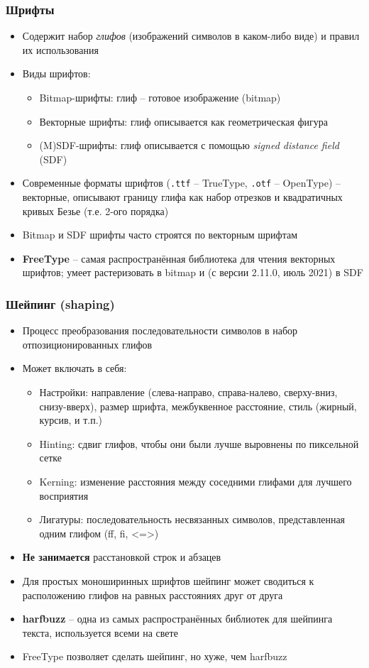 \documentclass{beamer}
\begin{document}
\begin{frame}[fragile]
\frametitle{Шрифты}
\begin{itemize}
\item Содержит набор \textit{глифов} (изображений символов в каком-либо виде) и правил их использования
\pause
\item Виды шрифтов:
\pause
\begin{itemize}
\item Bitmap-шрифты: глиф -- готовое изображение (bitmap)
\pause
\item Векторные шрифты: глиф описывается как геометрическая фигура
\pause
\item (M)SDF-шрифты: глиф описывается с помощью \textit{signed distance field} (SDF)
\end{itemize}
\pause
\item Современные форматы шрифтов (\verb|.ttf| -- TrueType, \verb|.otf| -- OpenType) -- векторные, описывают границу глифа как набор отрезков и квадратичных кривых Безье (т.е. 2-ого порядка)
\pause
\item Bitmap и SDF шрифты часто строятся по векторным шрифтам
\pause
\item \textbf{FreeType} -- самая распространённая библиотека для чтения векторных шрифтов; умеет растеризовать в bitmap и (с версии 2.11.0, июль 2021) в SDF
\end{itemize}
\end{frame}

\begin{frame}[fragile]
\frametitle{Шейпинг (shaping)}
\begin{itemize}
\item Процесс преобразования последовательности символов в набор отпозиционированных глифов
\pause
\item Может включать в себя:
\pause
\begin{itemize}
\item Настройки: направление (слева-направо, справа-налево, сверху-вниз, снизу-вверх), размер шрифта, межбуквенное расстояние, стиль (жирный, курсив, и т.п.)
\pause
\item Hinting: сдвиг глифов, чтобы они были лучше выровнены по пиксельной сетке
\pause
\item Kerning: изменение расстояния между соседними глифами для лучшего восприятия
\pause
\item Лигатуры: последовательность несвязанных символов, представленная одним глифом (ff, fi, <=>)
\end{itemize}
\pause
\item \textbf{Не занимается} расстановкой строк и абзацев
\pause
\item Для простых моноширинных шрифтов шейпинг может сводиться к расположению глифов на равных расстояниях друг от друга
\pause
\item \textbf{harfbuzz} -- одна из самых распространённых библиотек для шейпинга текста, используется всеми на свете
\item FreeType позволяет сделать шейпинг, но хуже, чем harfbuzz
\end{itemize}
\end{frame}
\end{document}

